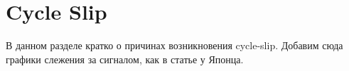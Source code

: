 \section {Cycle Slip}
В данном разделе кратко о причинах возникновения cycle-slip. Добавим сюда графики слежения за сигналом, как в статье у Японца. 